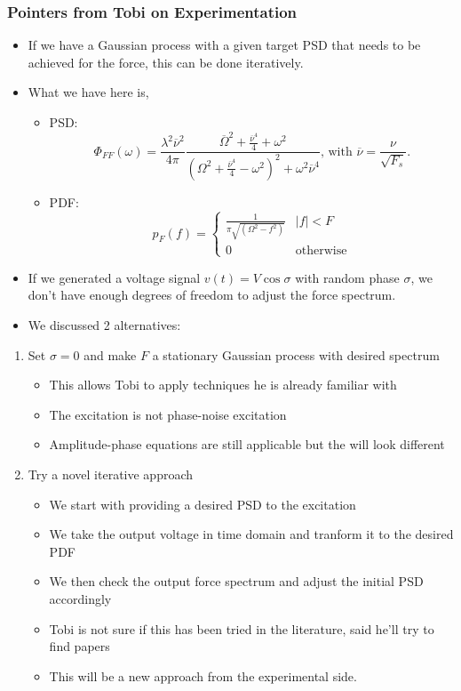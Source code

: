 \documentclass[11pt]{article}
\begin{document}
\subsubsection{Pointers from Tobi on Experimentation}
\label{sec:org917f6d4}
\begin{itemize}
\item If we have a Gaussian process with a given target PSD that needs to be achieved for the force, this can be done iteratively.
\item What we have here is,
\begin{itemize}
\item PSD:
$$ \Phi_{FF}(\omega) = \frac{\lambda^2\overline{\nu}^2}{4\pi} \frac{\overline{\Omega}^2+\frac{\overline{\nu}^4}{4}+\omega^2}{(\Omega^2+\frac{\overline{\nu}^4}{4}-\omega^2)^2+\omega^2\overline{\nu}^4}\text{, with } \overline{\nu}=\frac{\nu}{\sqrt{F_s}}.  $$
\item PDF:
\begin{equation*}
  p_F(f) = \begin{cases} \frac{1}{\pi\sqrt{(\Omega^2-f^2)}} & |f|< F\\
    0 & \text{otherwise} \end{cases}
\end{equation*}
\end{itemize}
\item If we generated a voltage signal \(v(t) = V\cos\sigma\) with random phase \(\sigma\), we don't have enough degrees of freedom to adjust the force spectrum.
\item We discussed 2 alternatives:
\end{itemize}
\begin{enumerate}
\item Set \(\sigma=0\) and make \(F\) a stationary Gaussian process with desired spectrum
\label{sec:org829d1d8}
\begin{itemize}
\item This allows Tobi to apply techniques he is already familiar with
\item The excitation is not phase-noise excitation
\item Amplitude-phase equations are still applicable but the will look different
\end{itemize}
\item Try a novel iterative approach
\label{sec:org702c073}
\begin{itemize}
\item We start with providing a desired PSD to the excitation
\item We take the output voltage in time domain and tranform it to the desired PDF
\item We then check the output force spectrum and adjust the initial PSD accordingly
\item Tobi is not sure if this has been tried in the literature, said he'll try to find papers
\item This will be a new approach from the experimental side.
\end{itemize}
\end{enumerate}
\end{document}
